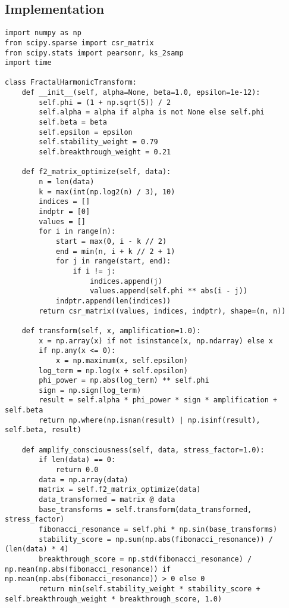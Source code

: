 \documentclass[12pt]{article}
\begin{document}
\subsection{Implementation}
\begin{lstlisting}
import numpy as np
from scipy.sparse import csr_matrix
from scipy.stats import pearsonr, ks_2samp
import time

class FractalHarmonicTransform:
    def __init__(self, alpha=None, beta=1.0, epsilon=1e-12):
        self.phi = (1 + np.sqrt(5)) / 2
        self.alpha = alpha if alpha is not None else self.phi
        self.beta = beta
        self.epsilon = epsilon
        self.stability_weight = 0.79
        self.breakthrough_weight = 0.21

    def f2_matrix_optimize(self, data):
        n = len(data)
        k = max(int(np.log2(n) / 3), 10)
        indices = []
        indptr = [0]
        values = []
        for i in range(n):
            start = max(0, i - k // 2)
            end = min(n, i + k // 2 + 1)
            for j in range(start, end):
                if i != j:
                    indices.append(j)
                    values.append(self.phi ** abs(i - j))
            indptr.append(len(indices))
        return csr_matrix((values, indices, indptr), shape=(n, n))

    def transform(self, x, amplification=1.0):
        x = np.array(x) if not isinstance(x, np.ndarray) else x
        if np.any(x <= 0):
            x = np.maximum(x, self.epsilon)
        log_term = np.log(x + self.epsilon)
        phi_power = np.abs(log_term) ** self.phi
        sign = np.sign(log_term)
        result = self.alpha * phi_power * sign * amplification + self.beta
        return np.where(np.isnan(result) | np.isinf(result), self.beta, result)

    def amplify_consciousness(self, data, stress_factor=1.0):
        if len(data) == 0:
            return 0.0
        data = np.array(data)
        matrix = self.f2_matrix_optimize(data)
        data_transformed = matrix @ data
        base_transforms = self.transform(data_transformed, stress_factor)
        fibonacci_resonance = self.phi * np.sin(base_transforms)
        stability_score = np.sum(np.abs(fibonacci_resonance)) / (len(data) * 4)
        breakthrough_score = np.std(fibonacci_resonance) / np.mean(np.abs(fibonacci_resonance)) if np.mean(np.abs(fibonacci_resonance)) > 0 else 0
        return min(self.stability_weight * stability_score + self.breakthrough_weight * breakthrough_score, 1.0)


\end{lstlisting}
\end{document}
